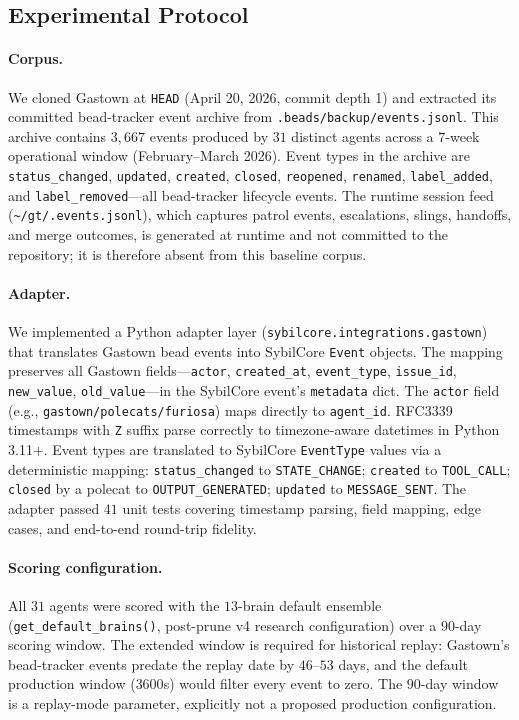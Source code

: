 \subsection{Experimental Protocol}
\label{sec:gastown:protocol}

\paragraph{Corpus.}
We cloned Gastown at \texttt{HEAD} (April 20, 2026, commit depth 1) and
extracted its committed bead-tracker event archive from
\texttt{.beads/backup/events.jsonl}. This archive contains $3{,}667$
events produced by $31$ distinct agents across a $7$-week operational
window (February--March 2026). Event types in the archive are
\texttt{status\_changed}, \texttt{updated}, \texttt{created},
\texttt{closed}, \texttt{reopened}, \texttt{renamed},
\texttt{label\_added}, and \texttt{label\_removed}---all bead-tracker
lifecycle events. The runtime session feed (\texttt{\textasciitilde/gt/.events.jsonl}),
which captures patrol events, escalations, slings, handoffs, and merge
outcomes, is generated at runtime and not committed to the repository;
it is therefore absent from this baseline corpus.

\paragraph{Adapter.}
We implemented a Python adapter layer
(\texttt{sybilcore.integrations.gastown}) that translates Gastown bead
events into SybilCore \texttt{Event} objects. The mapping preserves all
Gastown fields---\texttt{actor}, \texttt{created\_at}, \texttt{event\_type},
\texttt{issue\_id}, \texttt{new\_value}, \texttt{old\_value}---in the
SybilCore event's \texttt{metadata} dict. The \texttt{actor} field
(e.g., \texttt{gastown/polecats/furiosa}) maps directly to
\texttt{agent\_id}. RFC3339 timestamps with \texttt{Z} suffix parse
correctly to timezone-aware datetimes in Python 3.11+. Event types are
translated to SybilCore \texttt{EventType} values via a deterministic
mapping: \texttt{status\_changed} to \texttt{STATE\_CHANGE};
\texttt{created} to \texttt{TOOL\_CALL}; \texttt{closed} by a polecat to
\texttt{OUTPUT\_GENERATED}; \texttt{updated} to \texttt{MESSAGE\_SENT}.
The adapter passed $41$ unit tests covering timestamp parsing, field
mapping, edge cases, and end-to-end round-trip fidelity.

\paragraph{Scoring configuration.}
All $31$ agents were scored with the $13$-brain default ensemble
(\texttt{get\_default\_brains()}, post-prune v4 research configuration)
over a $90$-day scoring window. The extended window is required for
historical replay: Gastown's bead-tracker events predate the replay date
by $46$--$53$ days, and the default production window ($3600$s) would
filter every event to zero. The $90$-day window is a replay-mode
parameter, explicitly not a proposed production configuration.


